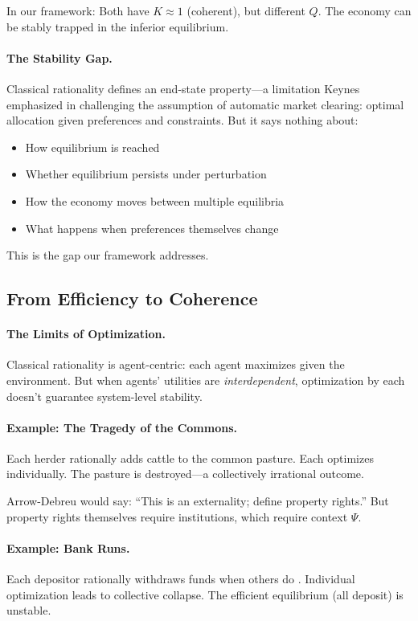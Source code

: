 \documentclass[12pt,a4paper]{article}
\begin{document}
In our framework: Both have $K \approx 1$ (coherent), but different $Q$.
The economy can be stably trapped in the inferior equilibrium.

\paragraph{The Stability Gap.}
Classical rationality defines an end-state property---a limitation Keynes \citep{keynes1936} emphasized in challenging the assumption of automatic market clearing:
optimal allocation given preferences and constraints.
But it says nothing about:
\begin{itemize}
  \item How equilibrium is reached
  \item Whether equilibrium persists under perturbation
  \item How the economy moves between multiple equilibria
  \item What happens when preferences themselves change
\end{itemize}

This is the gap our framework addresses.

\subsection{From Efficiency to Coherence}

\paragraph{The Limits of Optimization.}
Classical rationality is agent-centric: each agent maximizes given the environment.
But when agents' utilities are \emph{interdependent}, optimization by each
doesn't guarantee system-level stability.

\paragraph{Example: The Tragedy of the Commons.}
Each herder rationally adds cattle to the common pasture.
Each optimizes individually.
The pasture is destroyed---a collectively irrational outcome.

Arrow-Debreu would say: ``This is an externality; define property rights.''
But property rights themselves require institutions, which require context $\Psi$.

\paragraph{Example: Bank Runs.}
Each depositor rationally withdraws funds when others do \citep{diamonddybvig1983}.
Individual optimization leads to collective collapse.
The efficient equilibrium (all deposit) is unstable.
\end{document}
